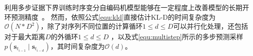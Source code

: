 利用多步证据下界训练时序变分自编码机模型能够在一定程度上改善模型的长期开环预测精度~\cite{Hafner2019}。
然而，依照公式\eqref{equ:kld}直接估计KL-D的时间复杂度为$\mathcal{O}(N*D^2)$，除了对序列不同位置的计算循环$1\leq d \leq D$可以并行化处理，还包括对于最大距离$D$的外循环$1\leq d \leq D$ ，以及式\eqref{equ:multistep}所示的多步预测采样$p\left(\boldsymbol{s}_{t_{i-1}} \mid \boldsymbol{s}_{t_{i-d}}\right)$，其时间复杂度为$\mathcal{O}(d)$。

